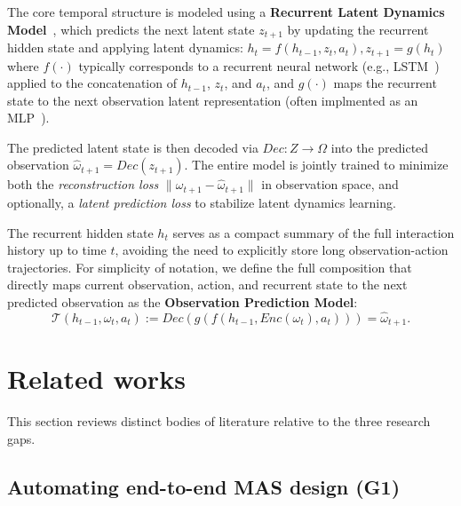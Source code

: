 \documentclass[pdflatex,sn-mathphys-num]{sn-jnl}%
\theoremstyle{thmstyleone}%
\theoremstyle{thmstyletwo}%
\theoremstyle{thmstylethree}%
\begin{document}
The core temporal structure is modeled using a \textbf{Recurrent Latent Dynamics Model}~\cite{hafner2020dream}, which predicts the next latent state $z_{t+1}$ by updating the recurrent hidden state and applying latent dynamics:
$h_t = f(h_{t-1}, z_t, a_t), z_{t+1} = g(h_t)$
where $f(\cdot)$ typically corresponds to a recurrent neural network (e.g., LSTM~\cite{hochreiter1997long}) applied to the concatenation of $h_{t-1}$, $z_t$, and $a_t$, and $g(\cdot)$ maps the recurrent state to the next observation latent representation (often implmented as an MLP~\cite{hochreiter1997long}).

The predicted latent state is then decoded via $Dec: Z \rightarrow \Omega$ into the predicted observation $\hat{\omega}_{t+1} = Dec(z_{t+1})$. The entire model is jointly trained to minimize both the \emph{reconstruction loss} $\|\omega_{t+1} - \hat{\omega}_{t+1}\|$ in observation space, and optionally, a \emph{latent prediction loss} to stabilize latent dynamics learning.

The recurrent hidden state $h_t$ serves as a compact summary of the full interaction history up to time $t$, avoiding the need to explicitly store long observation-action trajectories.
For simplicity of notation, we define the full composition that directly maps current observation, action, and recurrent state to the next predicted observation as the \textbf{Observation Prediction Model}:
\[
    \mathcal{T}(h_{t-1}, \omega_t, a_t) := Dec(g(f(h_{t-1}, Enc(\omega_t), a_t))) = \hat{\omega}_{t+1}.
\]


\section{Related works}\label{sec:related_works}

This section reviews distinct bodies of literature relative to the three research gaps.

\subsection{Automating end-to-end MAS design (G1)}
\end{document}
